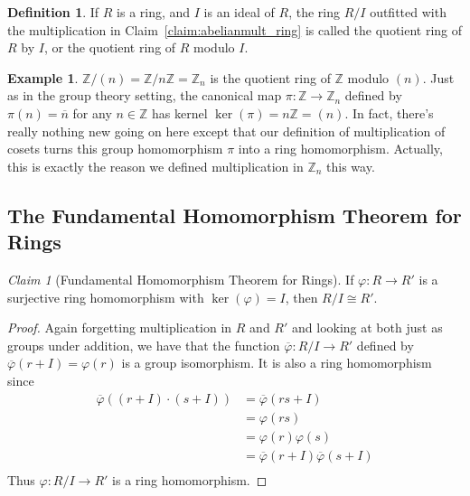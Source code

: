\documentclass[12pt,letterpaper,DIV=11,final]{scrartcl}
\theoremstyle{plain}
\theoremstyle{definition}
\newtheorem{definition}{Definition}[section]
\newtheorem{example}{Example}[section]
\theoremstyle{remark}
\newtheorem{claim}{Claim}
\begin{document}
\begin{definition}
  If $R$ is a ring, and $I$ is an ideal of $R$, the ring $R/I$ outfitted with the multiplication in Claim~\ref{claim:abelianmult_ring} is called the quotient ring of $R$ by $I$, or the quotient ring of $R$ modulo $I$.
\end{definition}

\begin{example}
  $\mathbb{Z}/(n) = \mathbb{Z}/n \mathbb{Z} = \mathbb{Z}_n$ is the quotient ring of $\mathbb{Z}$ modulo $(n)$.
  Just as in the group theory setting, the canonical map $\pi : \mathbb{Z} \to \mathbb{Z}_n$ defined by $\pi(n) = \overline{n}$ for any $n \in \mathbb{Z}$ has kernel $\ker(\pi) = n \mathbb{Z} = (n)$.
  In fact, there's really nothing new going on here except that our definition of multiplication of cosets turns this group homomorphism $\pi$ into a ring homomorphism.
  Actually, this is exactly the reason we defined multiplication in $\mathbb{Z}_n$ this way.
\end{example}

\subsection{The Fundamental Homomorphism Theorem for Rings}

\begin{claim}[Fundamental Homomorphism Theorem for Rings]
  If $\varphi : R \to R'$ is a surjective ring homomorphism with $\ker(\varphi) = I$, then $R/I \cong R'$.

  \begin{proof}
    Again forgetting multiplication in $R$ and $R'$ and looking at both just as groups under addition,
    we have that the function $\overline{\varphi} : R/I \to R'$ defined by $\overline{\varphi}(r + I) = \varphi(r)$ is a group isomorphism.
    It is also a ring homomorphism since
    \begin{align*}
      \overline{\varphi} \left( (r + I) \cdot (s + I) \right) &= \overline{\varphi}(rs + I) \\
                                                              &= \varphi(rs) \\
                                                              &= \varphi(r) \varphi(s) \\
                                                              &= \overline{\varphi}(r + I) \overline{\varphi}(s + I) \\
    \end{align*}
    Thus $\varphi : R/I \to R'$ is a ring homomorphism.
  \end{proof}
\end{claim}
\end{document}
